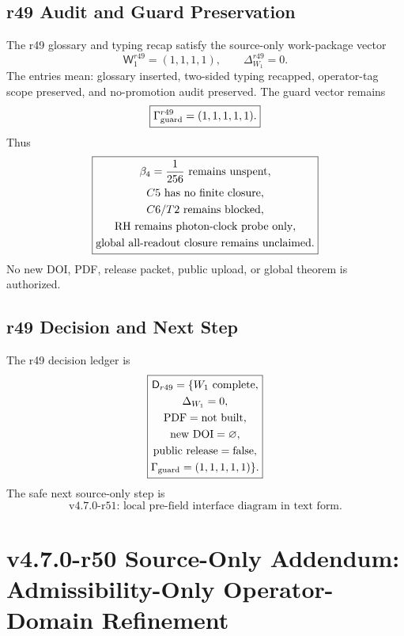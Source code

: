 \subsection{r49 Audit and Guard Preservation}
\label{subsec:r49-audit-guard-preservation}

The r49 glossary and typing recap satisfy the source-only work-package vector
\[
\boxed{
\mathsf W_1^{r49}=(1,1,1,1),
\qquad
\Delta_{W_1}^{r49}=0.
}
\]
The entries mean: glossary inserted, two-sided typing recapped, operator-tag
scope preserved, and no-promotion audit preserved.  The guard vector remains
\[
\boxed{
\Gamma_{\rm guard}^{r49}=(1,1,1,1,1).
}
\]
Thus
\[
\boxed{
\begin{gathered}
\beta_4={1\over256}\text{ remains unspent},\\
C5\text{ has no finite closure},\\
C6/T2\text{ remains blocked},\\
\mathrm{RH}\text{ remains photon-clock probe only},\\
\text{global all-readout closure remains unclaimed}.
\end{gathered}
}
\]
No new DOI, PDF, release packet, public upload, or global theorem is authorized.

\subsection{r49 Decision and Next Step}
\label{subsec:r49-decision-next-step}

The r49 decision ledger is
\[
\boxed{
\begin{gathered}
\mathsf D_{r49}
=
\{
W_1\text{ complete},\\
\Delta_{W_1}=0,\\
\mathrm{PDF}=\mathrm{not\ built},\\
\mathrm{new\ DOI}=\varnothing,\\
\mathrm{public\ release}=\mathrm{false},\\
\Gamma_{\rm guard}=(1,1,1,1,1)
\}.
\end{gathered}
}
\]
The safe next source-only step is
\[
\boxed{
\text{v4.7.0-r51: local pre-field interface diagram in text form.}
}
\]



\section{v4.7.0-r50 Source-Only Addendum: Admissibility-Only Operator-Domain Refinement}
\label{sec:r50-operator-domain-refinement}

